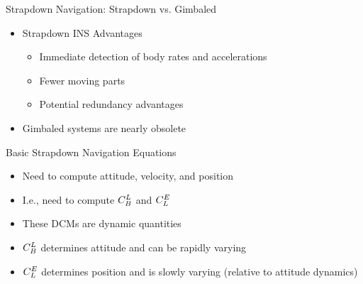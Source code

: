 \begin{frame}
Strapdown Navigation: Strapdown vs. Gimbaled
\begin{itemize}
  \item Strapdown INS Advantages
  \begin{itemize}
	\item Immediate detection of body rates and accelerations
	\item Fewer moving parts
	\item Potential redundancy advantages
  \end{itemize} 
  \item Gimbaled systems are nearly obsolete
\end{itemize} 
\end{frame}

\begin{frame}
\end{frame}

\begin{frame}
Basic Strapdown Navigation Equations
 \begin{itemize}
 \item Need to compute attitude, velocity, and position
 \item I.e., need to compute $C_{B}^{L}$ and $C_{L}^{E}$
 \item These DCMs are dynamic quantities
 \item $C_{B}^{L}$ determines attitude and can be rapidly varying
 \item $C_{L}^{E}$ determines position and is slowly varying (relative to attitude dynamics)
\end{itemize}
\end{frame}

